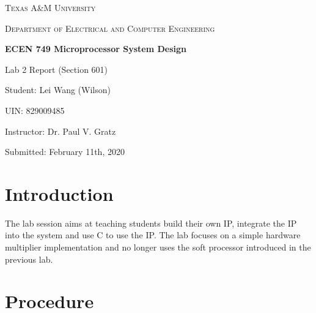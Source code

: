 \documentclass[11pt,letterpaper,titlepage]{article}
\begin{document}
\begin{titlepage}
  \centering
	{\scshape\large Texas A\&M University \par}
	\vspace{1cm}
	{\scshape\Large Department of Electrical and Computer Engineering \par}
	\vspace{4cm}
    \vspace{0.5cm}
	{\huge\bfseries ECEN 749 Microprocessor System Design\par}
	\vspace{4cm}
	{\Large Lab 2 Report (Section 601)\par}
	\vspace{1cm}
	{\Large Student: Lei Wang (Wilson)\par}
	\vspace{1cm}
	{\Large UIN: 829009485\par}
	\vspace{1cm}
	{\Large Instructor: Dr. Paul V. Gratz\par}
	\vspace{4cm}
	\vfill

	{\large Submitted: February 11th, 2020 \par}

\end{titlepage}

\newpage

\tableofcontents{}

\newpage

\part{Introduction}

The lab session aims at teaching students build their own IP, integrate the IP into the system and use C to use the IP. The lab focuses on a simple hardware multiplier implementation and no longer uses the soft processor introduced in the previous lab.

\part{Procedure}
\end{document}
